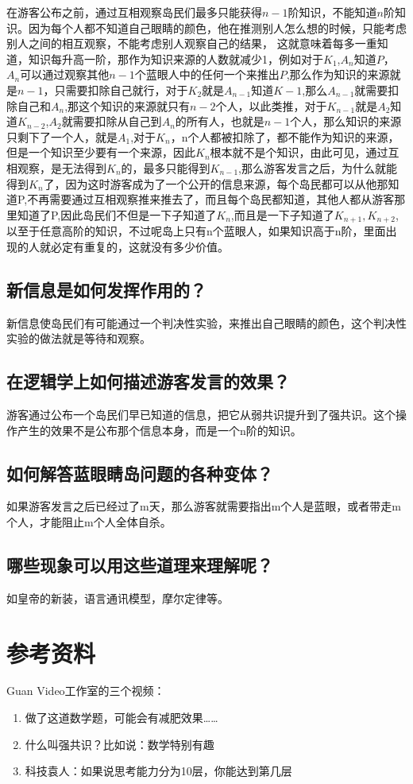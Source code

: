 \documentclass[lang=cn,11pt,a4paper]{elegantpaper}
\begin{document}
在游客公布之前，通过互相观察岛民们最多只能获得$n-1$阶知识，不能知道$n$阶知识。因为每个人都不知道自己眼睛的颜色，他在推测别人怎么想的时候，只能考虑别人之间的相互观察，不能考虑别人观察自己的结果， 这就意味着每多一重知道，知识每升高一阶，那作为知识来源的人数就减少1，例如对于$K_1$,$A_n$知道$P$，$A_n$可以通过观察其他$n-1$个蓝眼人中的任何一个来推出$P$,那么作为知识的来源就是$n-1$，只需要扣除自己就行，对于$K_2$就是$A_{n-1}$知道$K-1$,那么$A_{n-1}$就需要扣除自己和$A_n$,那这个知识的来源就只有$n-2$个人，以此类推，对于$K_{n-1}$就是$A_2$知道$K_{n-2}$,$A_2$就需要扣除从自己到$A_n$的所有人，也就是$n-1$个人，那么知识的来源只剩下了一个人，就是$A_1$,对于$K_n$，n个人都被扣除了，都不能作为知识的来源，但是一个知识至少要有一个来源，因此$K_n$根本就不是个知识，由此可见，通过互相观察，是无法得到$K_n$的，最多只能得到$K_{n-1}$,那么游客发言之后，为什么就能得到$K_n$了，因为这时游客成为了一个公开的信息来源，每个岛民都可以从他那知道P,不再需要通过互相观察推来推去了，而且每个岛民都知道，其他人都从游客那里知道了P,因此岛民们不但是一下子知道了$K_n$,而且是一下子知道了$K_{n+1},K_{n+2}$,以至于任意高阶的知识，不过呢岛上只有n个蓝眼人，如果知识高于n阶，里面出现的人就必定有重复的，这就没有多少价值。

\subsection{新信息是如何发挥作用的？}

新信息使岛民们有可能通过一个判决性实验，来推出自己眼睛的颜色，这个判决性实验的做法就是等待和观察。

\subsection{在逻辑学上如何描述游客发言的效果？}

游客通过公布一个岛民们早已知道的信息，把它从弱共识提升到了强共识。这个操作产生的效果不是公布那个信息本身，而是一个n阶的知识。

\subsection{如何解答蓝眼睛岛问题的各种变体？}

如果游客发言之后已经过了m天，那么游客就需要指出m个人是蓝眼，或者带走m个人，才能阻止m个人全体自杀。

\subsection{哪些现象可以用这些道理来理解呢？}

如皇帝的新装，语言通讯模型，摩尔定律等。

\section*{参考资料}

Guan Video工作室的三个视频：
\begin{enumerate}
\item 做了这道数学题，可能会有减肥效果\ldots\ldots
\item 什么叫强共识？比如说：数学特别有趣
\item 科技袁人：如果说思考能力分为10层，你能达到第几层
\end{enumerate}
\end{document}

